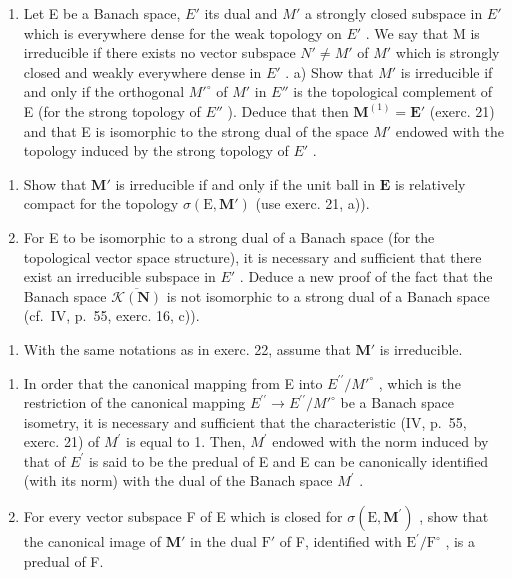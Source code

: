\begin{enumerate}
\def\labelenumi{\arabic{enumi})}
\setcounter{enumi}{21}
\tightlist
\item
  Let E be a Banach space, \(E'\) its dual and \(M'\) a strongly closed subspace in \(E'\) which is everywhere dense for the weak topology on \(E'\) . We say that M is irreducible if there exists no vector subspace \(N' \neq M'\) of \(M'\) which is strongly closed and weakly everywhere dense in \(E'\) . a) Show that \(M'\) is irreducible if and only if the orthogonal \(M'^{\circ}\) of \(M'\) in \(E''\) is the topological complement of E (for the strong topology of \(E''\) ). Deduce that then \(\mathbf{M}^{(1)} = \mathbf{E}'\) (exerc. 21) and that E is isomorphic to the strong dual of the space \(M'\) endowed with the topology induced by the strong topology of \(E'\) .
\end{enumerate}

\begin{enumerate}
\def\labelenumi{\alph{enumi})}
\setcounter{enumi}{1}
\item
  Show that \(\mathbf{M}'\) is irreducible if and only if the unit ball in \(\mathbf{E}\) is relatively compact for the topology \(\sigma (\mathrm{E},\mathbf{M}')\) (use exerc. 21, a)).
\item
  For E to be isomorphic to a strong dual of a Banach space (for the topological vector space structure), it is necessary and sufficient that there exist an irreducible subspace in \(E'\) . Deduce a new proof of the fact that the Banach space \(\overline{\mathcal{K}(\mathbf{N})}\) is not isomorphic to a strong dual of a Banach space (cf.~IV, p.~55, exerc. 16, c)).
\end{enumerate}

\begin{enumerate}
\def\labelenumi{\arabic{enumi})}
\setcounter{enumi}{22}
\tightlist
\item
  With the same notations as in exerc. 22, assume that \(\mathbf{M}'\) is irreducible.
\end{enumerate}

\begin{enumerate}
\def\labelenumi{\alph{enumi})}
\item
  In order that the canonical mapping from E into \(E^{\prime\prime}/M'^{\circ}\) , which is the restriction of the canonical mapping \(E^{\prime\prime} \rightarrow E^{\prime\prime}/M'^{\circ}\) be a Banach space isometry, it is necessary and sufficient that the characteristic (IV, p.~55, exerc. 21) of \(M^{\prime}\) is equal to 1. Then, \(M^{\prime}\) endowed with the norm induced by that of \(E^{\prime}\) is said to be the predual of E and E can be canonically identified (with its norm) with the dual of the Banach space \(M^{\prime}\) .
\item
  For every vector subspace F of E which is closed for \(\sigma (\mathrm{E},\mathbf{M}^{\prime})\) , show that the canonical image of \(\mathbf{M}'\) in the dual \(\mathrm{F}'\) of F, identified with \(\mathrm{E}^{\prime} / \mathrm{F}^{\circ}\) , is a predual of F.
\end{enumerate}

